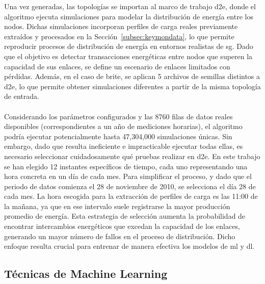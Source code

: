 Una vez generadas, las topologías se importan al marco de trabajo \gls{d2e}, donde el algoritmo ejecuta simulaciones para modelar la distribución de energía entre los nodos. Dichas simulaciones incorporan perfiles de carga reales previamente extraídos y procesados en la Sección~\ref{subsec:keymondata}, lo que permite reproducir procesos de distribución de energía en entornos realistas de \gls{sg}. Dado que el objetivo es detectar transacciones energéticas entre nodos que superen la capacidad de sus enlaces, se define un escenario de enlaces limitados con pérdidas. Además, en el caso de \gls{brite}, se aplican 5 archivos de semillas distintos a \gls{d2e}, lo que permite obtener simulaciones diferentes a partir de la misma topología de entrada. \\ 
\\
Considerando los parámetros configurados y las 8760 filas de datos reales disponibles (correspondientes a un año de mediciones horarias), el algoritmo podría ejecutar potencialmente hasta 47,304,000 simulaciones únicas. Sin embargo, dado que resulta ineficiente e impracticable ejecutar todas ellas, es necesario seleccionar cuidadosamente qué pruebas realizar en \gls{d2e}. En este trabajo se han elegido 12 instantes específicos de tiempo, cada uno representando una hora concreta en un día de cada mes. Para simplificar el proceso, y dado que el periodo de datos comienza el 28 de noviembre de 2010, se selecciona el día 28 de cada mes. La hora escogida para la extracción de perfiles de carga es las 11:00 de la mañana, ya que en ese intervalo suele registrarse la mayor producción promedio de energía. Esta estrategia de selección aumenta la probabilidad de encontrar intercambios energéticos que excedan la capacidad de los enlaces, generando un mayor número de fallos en el proceso de distribución. Dicho enfoque resulta crucial para entrenar de manera efectiva los modelos de \gls{ml} y \gls{dl}.

\subsection{Técnicas de Machine Learning}
\label{sec:ml}

